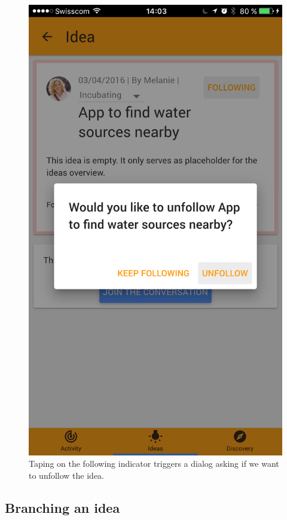 \documentclass[a4paper,12pt,twoside]{article}
\begin{document}
\begin{figure}[!htb]
\begin{minipage}[t]{.48\textwidth}
        \includegraphics[width=.67\textwidth]{images/flow_follow_4.png}
        \caption{Taping on the following indicator triggers a dialog asking if we want to unfollow the idea.}
    \end{minipage}
\end{figure}

\clearpage
\subsection{Branching an idea}
\label{sec.branchingIdea}
\end{document}
